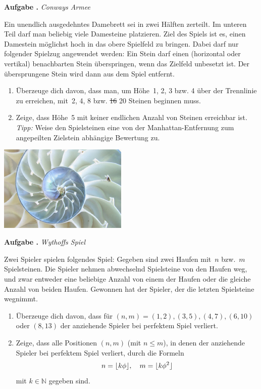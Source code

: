 \documentclass[a4paper,ngerman,twoside]{scrartcl}
\newlength{\aufgabenskip}
\newcounter{aufgabennummer}
\newenvironment{aufgabe}[1]{
  \addtocounter{aufgabennummer}{1}
  \textbf{Aufgabe \theaufgabennummer.} \emph{#1} \par
}{\vspace{\aufgabenskip}}
\newcommand{\NN}{\mathbb{N}}
\DeclarePairedDelimiter{\floor}{\lfloor}{\rfloor}
\begin{document}
\begin{aufgabe}{Conways Armee}
Ein unendlich ausgedehntes Damebrett sei in zwei Hälften zerteilt. Im unteren
Teil darf man beliebig viele Damesteine platzieren. Ziel des Spiels ist es,
einen Damestein möglichst hoch in das obere Spielfeld zu
bringen. Dabei darf nur folgender Spielzug angewendet werden: Ein Stein
darf einen (horizontal oder vertikal) benachbarten Stein überspringen, wenn das
Zielfeld unbesetzt ist. Der übersprungene Stein wird dann aus dem Spiel
entfernt.
\begin{enumerate}
\item Überzeuge dich davon, dass man, um Höhe~1, 2, 3 bzw. 4 über der
Trennlinie zu erreichen, mit~2, 4, 8 bzw. \sout{16} 20 Steinen beginnen muss.
\item Zeige, dass Höhe~5 mit keiner endlichen Anzahl von Steinen erreichbar
ist.
\emph{Tipp:} Weise den Spielsteinen eine von der Manhattan-Entfernung zum
angepeilten Zielstein abhängige Bewertung zu.
\end{enumerate}
\end{aufgabe}

\begin{center}\includegraphics[width=0.46\textwidth]{goldene-spirale-2}\end{center}

\begin{aufgabe}{Wythoffs Spiel}
Zwei Spieler spielen folgendes Spiel: Gegeben sind zwei Haufen mit~$n$
bzw.~$m$ Spielsteinen. Die Spieler nehmen abwechselnd Spielsteine von
den Haufen weg, und zwar entweder eine beliebige Anzahl von einem der
Haufen oder die gleiche Anzahl von beiden Haufen. Gewonnen hat der
Spieler, der die letzten Spielsteine wegnimmt.
\begin{enumerate}
\item Überzeuge dich davon, dass für $(n,m) = (1,2),(3,5),(4,7),(6,10)$
oder $(8,13)$ der anziehende Spieler bei perfektem Spiel verliert.
\item Zeige, dass alle Positionen $(n,m)$ (mit $n\leq m$), in denen der
anziehende Spieler bei perfektem Spiel verliert, durch die Formeln
\[ n = \floor{k\phi}, \quad m = \floor{k\phi^2} \]
mit $k\in\NN$ gegeben sind.
\end{enumerate}
\end{aufgabe}
\end{document}
